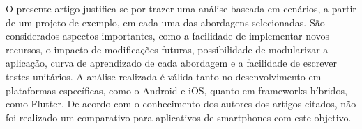 O presente artigo justifica-se por trazer uma análise baseada em cenários, a partir de um projeto de exemplo, em cada uma das abordagens selecionadas.
São considerados aspectos importantes, como a facilidade de implementar novos recursos, o impacto de modificações futuras, possibilidade de modularizar a aplicação, curva de aprendizado de cada abordagem e a facilidade de escrever testes unitários.
A análise realizada é válida tanto no desenvolvimento em plataformas específicas, como o Android e iOS, quanto em frameworks híbridos, como Flutter.
De acordo com o conhecimento dos autores dos artigos citados, não foi realizado um comparativo para aplicativos de smartphones com este objetivo.

\clearpage